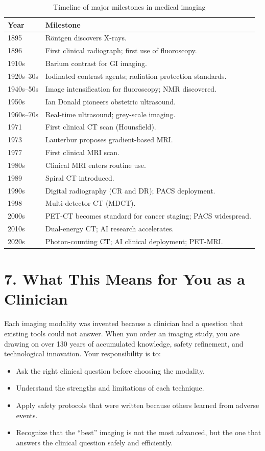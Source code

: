 \begin{table}[h]
\centering
\caption{Timeline of major milestones in medical imaging}
\begin{tabular}{|l|p{10cm}|}
\hline
\textbf{Year} & \textbf{Milestone} \\
\hline
1895 & R\"{o}ntgen discovers X-rays. \\
\hline
1896 & First clinical radiograph; first use of fluoroscopy. \\
\hline
1910s & Barium contrast for GI imaging. \\
\hline
1920s--30s & Iodinated contrast agents; radiation protection standards. \\
\hline
1940s--50s & Image intensification for fluoroscopy; NMR discovered. \\
\hline
1950s & Ian Donald pioneers obstetric ultrasound. \\
\hline
1960s--70s & Real-time ultrasound; grey-scale imaging. \\
\hline
1971 & First clinical CT scan (Hounsfield). \\
\hline
1973 & Lauterbur proposes gradient-based MRI. \\
\hline
1977 & First clinical MRI scan. \\
\hline
1980s & Clinical MRI enters routine use. \\
\hline
1989 & Spiral CT introduced. \\
\hline
1990s & Digital radiography (CR and DR); PACS deployment. \\
\hline
1998 & Multi-detector CT (MDCT). \\
\hline
2000s & PET-CT becomes standard for cancer staging; PACS widespread. \\
\hline
2010s & Dual-energy CT; AI research accelerates. \\
\hline
2020s & Photon-counting CT; AI clinical deployment; PET-MRI. \\
\hline
\end{tabular}
\end{table}


\section*{7. What This Means for You as a Clinician}
Each imaging modality was invented because a clinician had a question that existing tools could not answer. When you order an imaging study, you are drawing on over 130 years of accumulated knowledge, safety refinement, and technological innovation. Your responsibility is to:
\begin{itemize}
    \item Ask the right clinical question before choosing the modality.
    \item Understand the strengths and limitations of each technique.
    \item Apply safety protocols that were written because others learned from adverse events.
    \item Recognize that the ``best'' imaging is not the most advanced, but the one that answers the clinical question safely and efficiently.
\end{itemize}

